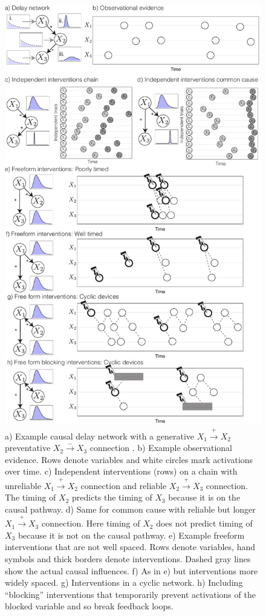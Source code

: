 \documentclass{cambridge7A}%
\begin{document}
\begin{figure}[t]
   \centering
   \includegraphics[width = .5\columnwidth]{DN}
   \caption{a) Example causal delay network with a generative $X_1\!\stackrel{+}\rightarrow\!X_2$ preventative $X_2\!\stackrel{-}\rightarrow\!X_3$ connection \citep[see][]{bramley2018time,bramley2017dynamic}. b) Example observational evidence.  Rows denote variables and white circles mark activations over time.  c) Independent interventions (rows) on a chain with unreliable $X_1\!\stackrel{+}\rightarrow\!X_2$ connection and reliable $X_2\!\stackrel{+}\rightarrow\!X_3$ connection.   The timing of $X_2$ predicts the timing of $X_3$ because it is on the causal pathway.  d) Same for common cause with reliable but longer $X_1\!\stackrel{+}\rightarrow\!X_3$ connection.  Here timing of $X_2$ does not predict timing of $X_3$ because it is not on the causal pathway. e) Example freeform interventions that are not well spaced.   Rows denote variables, hand symbols and thick borders denote interventions.  Dashed gray lines show the actual causal influences.  f) As in e) but interventions more widely spaced.  g) Interventions in a cyclic network. h) Including ``blocking'' interventions that temporarily prevent activations of the blocked variable and so break feedback loops.}
   \label{fig:DN}
\end{figure}
\end{document}
